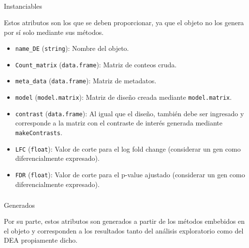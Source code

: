 \documentclass[
  9pt,
]{article}
\makeatletter
\let\oldsubparagraph\subparagraph
\renewcommand{\subparagraph}{
    \@ifstar
      \xxxSubParagraphStar
      \xxxSubParagraphNoStar
  }
\newcommand{\xxxSubParagraphStar}[1]{\oldsubparagraph*{#1}\mbox{}}
\newcommand{\xxxSubParagraphNoStar}[1]{\oldsubparagraph{#1}\mbox{}}
\makeatother
\begin{document}
\subparagraph{Instanciables}\label{instanciables}

Estos atributos son los que se deben proporcionar, ya que el objeto no
los genera por sí solo mediante sus métodos.

\begin{itemize}
\item
  \texttt{name\_DE} (\texttt{string}): Nombre del objeto.
\item
  \texttt{Count\_matrix} (\texttt{data.frame}): Matriz de conteos cruda.
\item
  \texttt{meta\_data} (\texttt{data.frame}): Matriz de metadatos.
\item
  \texttt{model} (\texttt{model.matrix}): Matriz de diseño creada
  mediante \texttt{model.matrix}.
\item
  \texttt{contrast} (\texttt{data.frame}): Al igual que el diseño,
  también debe ser ingresado y corresponde a la matriz con el contraste
  de interés generada mediante \texttt{makeContrasts}.
\item
  \texttt{LFC} (\texttt{float}): Valor de corte para el log fold change
  (considerar un gen como diferencialmente expresado).
\item
  \texttt{FDR} (\texttt{float}): Valor de corte para el p-value ajustado
  (considerar un gen como diferencialmente expresado).
\end{itemize}

\subparagraph{Generados}\label{generados}

Por su parte, estos atributos son generados a partir de los métodos
embebidos en el objeto y corresponden a los resultados tanto del
análisis exploratorio como del DEA propiamente dicho.
\end{document}
